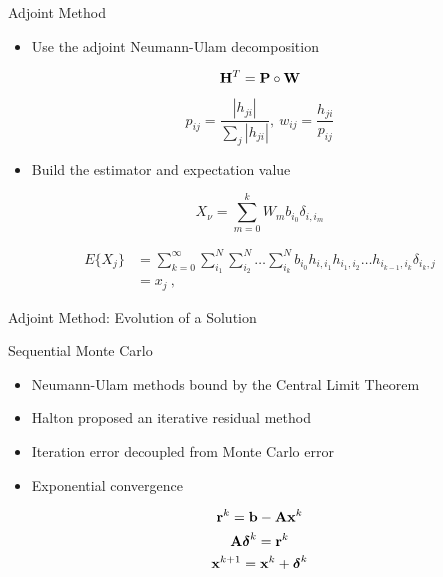 \documentclass{beamer}
\begin{document}
\begin{frame}{Adjoint Method}

  \begin{itemize}
  \item Use the adjoint Neumann-Ulam decomposition
  \end{itemize}

  \[
  \mathbf{H}^{T} = \mathbf{P} \circ \mathbf{W}
  \]

  \[
  p_{ij} = \frac{|h_{ji}|}{\sum_j |h_{ji}|},\ w_{ij} =
  \frac{h_{ji}}{p_{ij}}
  \]

  \begin{itemize}
  \item Build the estimator and expectation value
  \end{itemize}

  \[
  X_{\nu} = \sum_{m=0}^k W_{m} b_{i_0} \delta_{i,i_m}
  \]

  \[
  \begin{split}
    E\{X_j\} &=\sum_{k=0}^{\infty}\sum_{i_1}^{N}\sum_{i_2}^{N}\ldots
    \sum_{i_k}^{N} b_{i_0} h_{i,i_1}h_{i_1,i_2}\ldots h_{i_{k-1},i_k}
    \delta_{i_k,j} \\ &= x_{j}\:,
  \end{split}
  \]

\end{frame}

\begin{frame}{Adjoint Method: Evolution of a Solution}

\end{frame}

\begin{frame}{Sequential Monte Carlo}

  \begin{itemize}
  \item Neumann-Ulam methods bound by the Central Limit Theorem
  \item Halton proposed an iterative residual method
  \item Iteration error decoupled from Monte Carlo error
  \item Exponential convergence
  \end{itemize}

  \[
  \mathbf{r}^k = \mathbf{b} - \mathbf{A}\mathbf{x}^k
  \]
  \[
  \mathbf{A}\boldsymbol{\delta}^{k} = \mathbf{r}^{k}
  \]
  \[
  \mathbf{x}^{k+1} = \mathbf{x}^k + \boldsymbol{\delta}^{k}
  \]

\end{frame}
\end{document}
